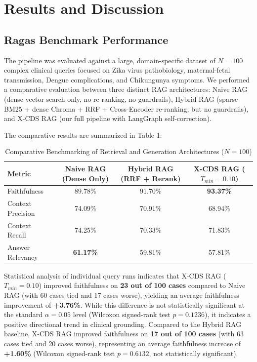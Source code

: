 \documentclass[sn-mathphys,Numbered]{sn-jnl}%
\begin{document}
\section{Results and Discussion}\label{sec4}

\subsection{Ragas Benchmark Performance}
The pipeline was evaluated against a large, domain-specific dataset of $N=100$ complex clinical queries focused on Zika virus pathobiology, maternal-fetal transmission, Dengue complications, and Chikungunya symptoms. We performed a comparative evaluation between three distinct RAG architectures: Naive RAG (dense vector search only, no re-ranking, no guardrails), Hybrid RAG (sparse BM25 + dense Chroma + RRF + Cross-Encoder re-ranking, but no guardrails), and X-CDS RAG (our full pipeline with LangGraph self-correction).

The comparative results are summarized in Table 1:

\begin{table}[ht]
\centering
\caption{Comparative Benchmarking of Retrieval and Generation Architectures ($N=100$)}
\label{tab1}
\begin{tabular}{lccc}
\toprule
Metric & Naive RAG (Dense Only) & Hybrid RAG (RRF + Rerank) & X-CDS RAG ($T_{min}=0.10$) \\
\midrule
Faithfulness & 89.78\% & 91.70\% & \textbf{93.37\%} \\
Context Precision & 74.09\% & 70.91\% & 68.94\% \\
Context Recall & 74.25\% & 70.33\% & 71.83\% \\
Answer Relevancy & \textbf{61.17\%} & 59.81\% & 57.81\% \\
\bottomrule
\end{tabular}
\end{table}

Statistical analysis of individual query runs indicates that X-CDS RAG ($T_{min}=0.10$) improved faithfulness on \textbf{23 out of 100 cases} compared to Naive RAG (with 60 cases tied and 17 cases worse), yielding an average faithfulness improvement of \textbf{+3.76\%}. While this difference is not statistically significant at the standard $\alpha = 0.05$ level (Wilcoxon signed-rank test $p = 0.1236$), it indicates a positive directional trend in clinical grounding. Compared to the Hybrid RAG baseline, X-CDS RAG improved faithfulness on \textbf{17 out of 100 cases} (with 63 cases tied and 20 cases worse), representing an average faithfulness increase of \textbf{+1.60\%} (Wilcoxon signed-rank test $p = 0.6132$, not statistically significant).
\end{document}
